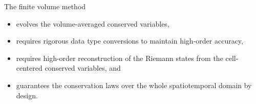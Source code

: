 The finite volume method
\begin{itemize}
    \item evolves the volume-averaged conserved variables,
    \item requires rigorous data type conversions to maintain high-order accuracy,
    \item requires high-order reconstruction of the Riemann states from the cell-centered conserved variables, and
    \item guarantees the conservation laws over the whole spatiotemporal domain by design.
\end{itemize}
